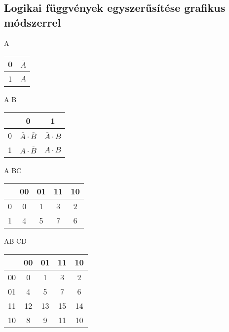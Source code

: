 \documentclass{article}
\begin{document}
\subsection{Logikai függvények egyszerűsítése grafikus módszerrel}
A
\begin{table}[ht]
    \begin{tabular}{c|c|}
        0 & \(\overline{A}\) \\
        \hline
        1 & \(A\)            \\
    \end{tabular}
\end{table}
\newline
A B
\begin{table}[ht]
    \begin{tabular}{c|c|c|}
          & 0                                   & 1                        \\
        \hline
        0 & \(\overline{A} \cdot \overline{B}\) & \(\overline{A} \cdot B\) \\
        \hline
        1 & \(A \cdot \overline{B}\)            & \(A \cdot B\)            \\
    \end{tabular}
\end{table}
\newline
A BC
\begin{table}[ht]
    \begin{tabular}{c|c|c|c|c|}
          & 00 & 01 & 11 & 10 \\
        \hline
        0 & 0  & 1  & 3  & 2  \\
        \hline
        1 & 4  & 5  & 7  & 6  \\
    \end{tabular}
\end{table}
\newpage
AB CD
\begin{table}[ht]
    \begin{tabular}{c|c|c|c|c|}
           & 00 & 01 & 11 & 10 \\
        \hline
        00 & 0  & 1  & 3  & 2  \\
        \hline
        01 & 4  & 5  & 7  & 6  \\
        \hline
        11 & 12 & 13 & 15 & 14 \\
        \hline
        10 & 8  & 9  & 11 & 10 \\
    \end{tabular}
\end{table}
\end{document}
